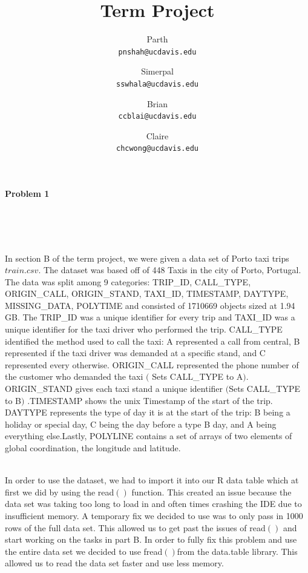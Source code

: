 \documentclass[11pt]{article}
\title{Term Project}
\author{Parth\\
\texttt{pnshah@ucdavis.edu}\and Simerpal\\
\texttt{sswhala@ucdavis.edu}\and Brian\\
\texttt{ccblai@ucdavis.edu}\and Claire\\
\texttt{chcwong@ucdavis.edu}}
\begin{document}
\maketitle
\begin{center}
{\LARGE\bfseries Problem 1}
\vspace{1cm}  
\end{center}

\\ \\

\\

\par
	In section B of the term project, we were given a data set of Porto taxi trips \(train.csv\).
 The dataset was based off of 448 Taxis in the city of Porto, Portugal. The data was split among 9
 categories: TRIP\_ID, CALL\_TYPE, ORIGIN\_CALL, ORIGIN\_STAND, TAXI\_ID, TIMESTAMP, DAYTYPE, MISSING\_DATA,
 POLYTIME and consisted of 1710669 objects sized at 1.94 GB. The TRIP\_ID was a unique identifier for
 every trip and TAXI\_ID was a unique identifier for the taxi driver who performed the trip. CALL\_TYPE
 identified the method used to call the taxi: \textsc{}A\textsc{} represented a call from central,
 \textsc{}B\textsc{} represented if the taxi driver was demanded at a specific stand, and 
 \textsc{}C\textsc{} represented every otherwise. ORIGIN\_CALL represented the phone number of the customer who
 demanded the taxi $($ Sets CALL\_TYPE to \textsc{}A\textsc{}$)$. ORIGIN\_STAND gives each taxi
 stand a unique identifier $($Sets CALL\_TYPE to \textsc{}B\textsc{}$)$ .TIMESTAMP shows the unix
 Timestamp of the start of the trip. DAYTYPE represents the type of day it is at the start of the trip: \textsc{}B
 \textsc{} being a holiday or special day, \textsc{}C\textsc{} being the day before a type
 \textsc{}B\textsc{} day, and \textsc{}A\textsc{} being everything else.Lastly,
 POLYLINE contains a set of arrays of two elements of global coordination, the longitude and latitude.\\

\\
\par
	 In order to use the dataset, we had to import it into our R data table which at first we did by using the read$()$
 function. This created an issue because the data set was taking too long to load in and often times crashing the
 IDE due to insufficient memory. A temporary fix we decided to use was to only pass in 1000 rows of the full data 
set. This allowed us to get past the issues of read$()$ and start working on the tasks in part B. In order to fully
 fix this problem and use the entire data set we decided to use fread$()$from the data.table library. This allowed
 us to read the data set faster and use less memory.\\
\end{document}

